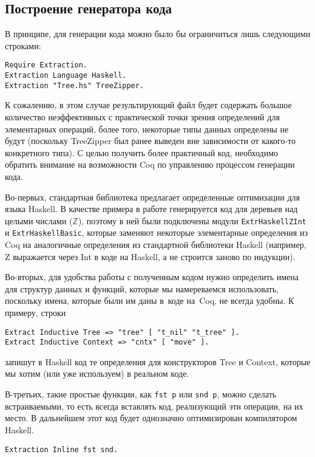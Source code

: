  
\subsection{Построение генератора кода}
В принципе, для генерации кода можно было бы ограничиться лишь следующими строками:
\begin{Verbatim}[fontsize=\small]
Require Extraction.
Extraction Language Haskell.
Extraction "Tree.hs" TreeZipper.
\end{Verbatim}
К сожалению, в этом случае результирующий файл будет содержать большое количество неэффективных с практической точки зрения определений для элементарных операций, более того, некоторые типы данных определены не будут (поскольку TreeZipper был ранее выведен вне зависимости от какого-то конкретного типа). С целью получить более практичный код, необходимо обратить внимание на возможности Coq по управлению процессом генерации кода.

Во-первых, стандартная библиотека предлагает определенные оптимизации для языка Haskell. В качестве примера в работе генерируется код для деревьев над целыми числами ($\mathbb{Z}$), поэтому в ней были подключены модули \texttt{ExtrHaskellZInt} и \texttt{ExtrHaskellBasic}, которые заменяют некоторые элементарные определения из Coq на аналогичные определения из стандартной библиотеки Haskell (например, Z выражается через Int  в коде на Haskell, а не строится заново по индукции).

Во-вторых, для удобства работы с полученным кодом нужно определить имена для структур данных и функций, которые мы намереваемся использовать, поскольку имена, которые были им даны в~коде на~Coq, не всегда удобны. К примеру, строки
\begin{Verbatim}[fontsize=\small]
Extract Inductive Tree => "tree" [ "t_nil" "t_tree" ].
Extract Inductive Context => "cntx" [ "move" ].
\end{Verbatim}
запишут в Haskell код те определения для конструкторов Tree и Context, которые мы хотим (или уже используем) в реальном коде. 

В-третьих, такие простые функции, как \texttt{fst p} или \texttt{snd p}, можно сделать встраиваемыми, то есть всегда вставлять код, реализующий эти операции, на их место. В дальнейшем этот код будет однозначно оптимизирован компилятором Haskell.
\begin{Verbatim}[fontsize=\small]
Extraction Inline fst snd.
\end{Verbatim}

\newpage

